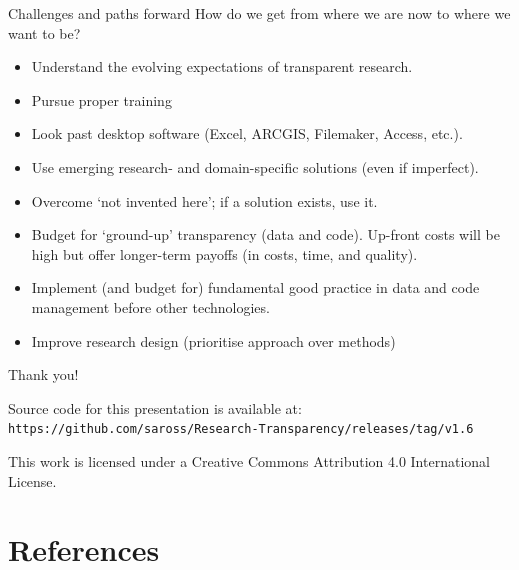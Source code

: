 \documentclass[aspectratio=169, 11pt]{beamer} %
\begin{document}
\begin{frame}{Challenges and paths forward}
  How do we get from where we are now to where we want to be?
      \begin{itemize}[label=\textbullet]
        \item Understand the evolving expectations of transparent research. 
        \item Pursue proper training
        \item Look past desktop software (Excel, ARCGIS, Filemaker, Access, etc.).
        \item Use emerging research- and domain-specific solutions (even if imperfect).
        \item Overcome `not invented here'; if a solution exists, use it.
        \item Budget for `ground-up' transparency (data and code). Up-front costs will be high but offer longer-term payoffs (in costs, time, and quality).
        \item Implement (and budget for) fundamental good practice in data and code management before other technologies.
        \item Improve research design (prioritise approach over methods) \cite{Muthukrishna2019-kt, Hole1973-cy}
    \end{itemize}
\end{frame}

\begin{frame}{Thank you!}


Source code for this presentation is available at: \texttt{https://github.com/saross/Research-Transparency/releases/tag/v1.6}

This work is licensed under a Creative Commons Attribution 4.0 International License.

\end{frame}

% 


\section{References}

\begin{multicols}{2}[]


\end{multicols}


  
%   
%   
\end{document}
